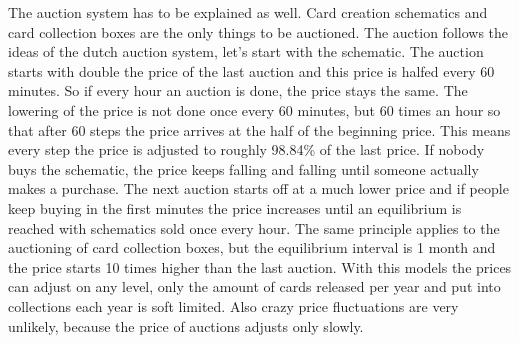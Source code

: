 \documentclass{article}
\begin{document}
%
\newline\newline
%
The auction system has to be explained as well. Card creation schematics and card collection boxes are the only things to be auctioned. The auction follows the ideas of the dutch auction system, let's start with the schematic. The auction starts with double the price of the last auction and this price is halfed every 60 minutes. So if every hour an auction is done, the price stays the same. The lowering of the price is not done once every 60 minutes, but 60 times an hour so that after 60 steps the price arrives at the half of the beginning price. This means every step the price is adjusted to roughly 98.84\% of the last price. If nobody buys the schematic, the price keeps falling and falling until someone actually makes a purchase. The next auction starts off at a much lower price and if people keep buying in the first minutes the price increases until an equilibrium is reached with schematics sold once every hour. The same principle applies to the auctioning of card collection boxes, but the equilibrium interval is 1 month and the price starts 10 times higher than the last auction. With this models the prices can adjust on any level, only the amount of cards released per year and put into collections each year is soft limited. Also crazy price fluctuations are very unlikely, because the price of auctions adjusts only slowly.
%
\end{document}
